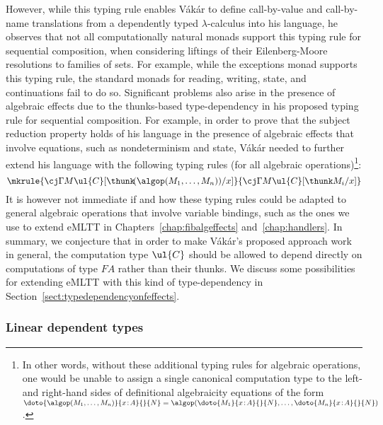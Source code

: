 However, while this typing rule enables V{\'{a}}k{\'{a}}r to define call-by-value and call-by-name translations from a dependently typed $\lambda$-calculus into his language, he observes that not all computationally natural monads support this typing rule for sequential composition, when considering  liftings of their Eilenberg-Moore resolutions to families of sets. For example, while the exceptions monad supports this typing rule, the standard monads for reading, writing, state, and continuations fail to do so. Significant problems also arise in the presence of algebraic effects due to the thunks-based type-dependency in his proposed typing rule for sequential composition. For example, in order to prove that the subject reduction property holds of his language in the presence of algebraic effects that involve equations, such as nondeterminism and state, V{\'{a}}k{\'{a}}r needed to further 
extend his language with the following
typing rules (for all algebraic operations)\footnote{In other words, without these additional typing rules for algebraic operations, one would be unable to assign a single canonical computation type to the left- and right-hand sides of definitional algebraicity equations of the form $\doto {\algop(M_1, \ldots, M_n)} {x \!:\! A} {} {N} = \algop(\doto {M_1} {x \!:\! A} {} {N}, \ldots, \doto {M_n} {x \!:\! A} {} {N})$.}:
\vspace{-0.1cm}
\[
\mkrule
{\cj \Gamma {M} {\ul{C}[\thunk\! (\algop(M_1, \ldots, M_n))/x]}}
{\cj \Gamma {M} {\ul{C}[\thunk M_i/x]}}
\]
%
It is however not immediate if and how these typing rules could be adapted to general algebraic operations that involve variable bindings, such as the ones we use to extend eMLTT in Chapters~\ref{chap:fibalgeffects} and~\ref{chap:handlers}. 
%
In summary, we conjecture that in order to make V{\'{a}}k{\'{a}}r's proposed approach work in general, the computation type $\ul{C}$ should be allowed to depend directly on computations of type $FA$ rather than their thunks. We discuss some possibilities for extending eMLTT with this kind of type-dependency in Section~\ref{sect:typedependencyonfeffects}.


\subsubsection*{Linear dependent types}

